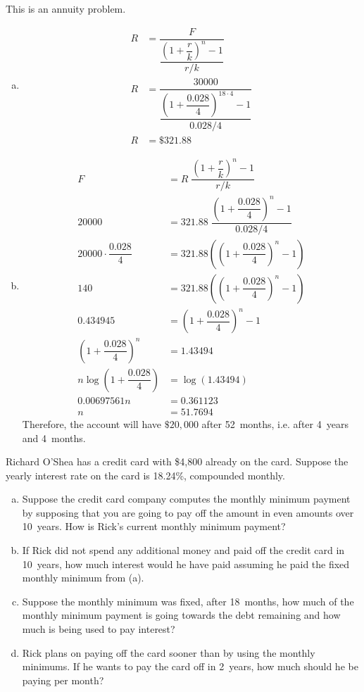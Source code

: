 \documentclass[11pt,letterpaper]{article}
\begin{document}
\sol This is an annuity problem.
\begin{enumerate}[(a)]
\item 
	\[
	\begin{aligned}
	R&= \dfrac{F}{\dfrac{\left(1 + \dfrac{r}{k} \right)^n - 1}{r/k}} \\
	R&= \dfrac{30000}{\dfrac{\left(1 + \dfrac{0.028}{4} \right)^{18 \cdot 4} - 1}{0.028/4}} \\
	R&= \$321.88
	\end{aligned}
	\] \pspace

\item 
	\[
	\begin{aligned}
	F&= R \; \dfrac{\left(1 + \dfrac{r}{k} \right)^n - 1}{r/k} \\
	20000&= 321.88 \; \dfrac{\left(1 + \dfrac{0.028}{4} \right)^n - 1}{0.028/4} \\
	20000 \cdot \dfrac{0.028}{4}&= 321.88 \left( \left(1 + \dfrac{0.028}{4} \right)^n - 1 \right) \\
	140&= 321.88 \left( \left(1 + \dfrac{0.028}{4} \right)^n - 1 \right) \\
	0.434945&= \left(1 + \dfrac{0.028}{4} \right)^n - 1 \\
	\left(1 + \dfrac{0.028}{4} \right)^n&= 1.43494 \\
	n \log\left(1 + \dfrac{0.028}{4} \right)&= \log(1.43494) \\
	0.00697561n&= 0.361123 \\
	n&= 51.7694
	\end{aligned}
	\]
Therefore, the account will have $\$20,000$ after 52~months, i.e. after 4~years and 4~months. 
\end{enumerate}





\newpage





 Richard O'Shea has a credit card with \$4,800 already on the card. Suppose the yearly interest rate on the card is 18.24\%, compounded monthly. 
\begin{enumerate}[(a)]
\item Suppose the credit card company computes the monthly minimum payment by supposing that you are going to pay off the amount in even amounts over 10~years. How is Rick's current monthly minimum payment?
\item If Rick did not spend any additional money and paid off the credit card in 10~years, how much interest would he have paid assuming he paid the fixed monthly minimum from (a).
\item Suppose the monthly minimum was fixed, after 18~months, how much of the monthly minimum payment is going towards the debt remaining and how much is being used to pay interest?
\item Rick plans on paying off the card sooner than by using the monthly minimums. If he wants to pay the card off in 2~years, how much should he be paying per month?
\end{enumerate} 
\end{document}
